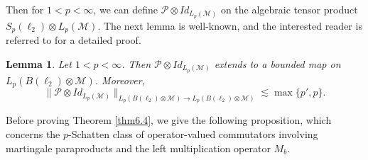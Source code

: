 \documentclass[oneside,english,a4wide]{amsart}
\numberwithin{equation}{section}
\numberwithin{figure}{section}
\theoremstyle{plain}
\theoremstyle{plain}
\theoremstyle{definition}
\theoremstyle{plain}
\newtheorem{lemma}[thm]{Lemma}
\theoremstyle{remark}
\theoremstyle{definition}
\theoremstyle{remark}
\theoremstyle{definition}
\newcommand{\M}{{\mathcal M}}
\newcommand{\8}{\infty}
\begin{document}
Then for $1<p<\8$, we can define $\mathcal{P}\otimes Id_{L_p(\M)}$ on the algebraic tensor product $S_p(\ell_2)\otimes L_p(\mathcal{M})$. The next lemma is well-known, and the interested reader is referred to \cite{Hao} for a detailed proof.
\begin{lemma}\label{triangle}
	Let $1<p<\infty$. Then $\mathcal{P}\otimes Id_{L_p(\mathcal{M})}$ extends to a bounded map on $L_p(B(\ell_2)\otimes \mathcal{M})$. Moreover, $$ \|\mathcal{P}\otimes Id_{L_p(\mathcal{M})}\|_{L_p(B(\ell_2)\otimes \mathcal{M}) \to L_p(B(\ell_2)\otimes \mathcal{M})}\lesssim \max\{p', p\}. $$
\end{lemma}



Before proving Theorem \ref{thm6.4}, we give the following proposition, which concerns the $p$-Schatten class of operator-valued commutators involving martingale paraproducts and the left multiplication operator $M_b$.
\end{document}
